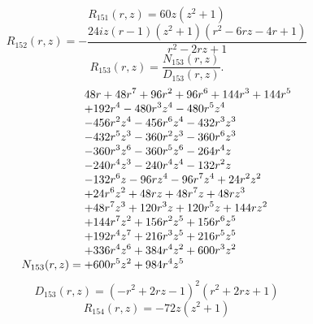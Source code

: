 \documentclass[11pt,a4paper]{article}
\begin{document}
\begin{equation}
R_{151}(r,z)=60 z \left(z^{2} + 1\right)
\label{eq:cat-rational-151}
\end{equation}
\begin{equation}
R_{152}(r,z)=- \frac{24 i z \left(r - 1\right) \left(z^{2} + 1\right) \left(r^{2} - 6 r z - 4 r + 1\right)}{r^{2} - 2 r z + 1}
\label{eq:cat-rational-152}
\end{equation}
\begin{equation}
R_{153}(r,z)=\frac{N_{153}(r,z)}{D_{153}(r,z)}.
\label{eq:cat-rational-153}
\end{equation}
\begin{equation}
N_{153}(r,z)=\shortstack[l]{$\displaystyle 48 r + 48 r^{7} + 96 r^{2} + 96 r^{6} + 144 r^{3} + 144 r^{5}$\\
$\displaystyle  + 192 r^{4} - 480 r^{3} z^{4} - 480 r^{5} z^{4}$\\
$\displaystyle  - 456 r^{2} z^{4} - 456 r^{6} z^{4} - 432 r^{3} z^{3}$\\
$\displaystyle  - 432 r^{5} z^{3} - 360 r^{2} z^{3} - 360 r^{6} z^{3}$\\
$\displaystyle  - 360 r^{3} z^{6} - 360 r^{5} z^{6} - 264 r^{4} z$\\
$\displaystyle  - 240 r^{4} z^{3} - 240 r^{4} z^{4} - 132 r^{2} z$\\
$\displaystyle  - 132 r^{6} z - 96 r z^{4} - 96 r^{7} z^{4} + 24 r^{2} z^{2}$\\
$\displaystyle  + 24 r^{6} z^{2} + 48 r z + 48 r^{7} z + 48 r z^{3}$\\
$\displaystyle  + 48 r^{7} z^{3} + 120 r^{3} z + 120 r^{5} z + 144 r z^{2}$\\
$\displaystyle  + 144 r^{7} z^{2} + 156 r^{2} z^{5} + 156 r^{6} z^{5}$\\
$\displaystyle  + 192 r^{4} z^{7} + 216 r^{3} z^{5} + 216 r^{5} z^{5}$\\
$\displaystyle  + 336 r^{4} z^{6} + 384 r^{4} z^{2} + 600 r^{3} z^{2}$\\
$\displaystyle  + 600 r^{5} z^{2} + 984 r^{4} z^{5}$}
\label{eq:cat-numerator-153}
\end{equation}
\begin{equation}
D_{153}(r,z)=\left(- r^{2} + 2 r z - 1\right)^{2} \left(r^{2} + 2 r z + 1\right)
\label{eq:cat-denominator-153}
\end{equation}
\begin{equation}
R_{154}(r,z)=- 72 z \left(z^{2} + 1\right)
\label{eq:cat-rational-154}
\end{equation}
\end{document}
